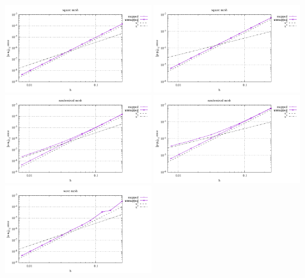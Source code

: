 \begin{center}
\includegraphics[width=6.5cm]{python_codes/fieldstone_76/results/bench1/straight/errors_V_mt1.pdf}
\includegraphics[width=6.5cm]{python_codes/fieldstone_76/results/bench1/straight/errors_P_mt1.pdf}\\
\includegraphics[width=6.5cm]{python_codes/fieldstone_76/results/bench1/straight/errors_V_mt2.pdf}
\includegraphics[width=6.5cm]{python_codes/fieldstone_76/results/bench1/straight/errors_P_mt2.pdf}\\
\includegraphics[width=6.5cm]{python_codes/fieldstone_76/results/bench1/straight/errors_V_mt3.pdf}

\end{center}
